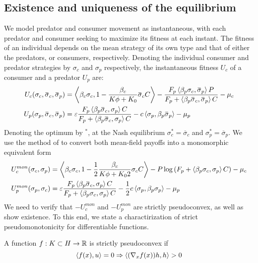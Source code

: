 \subsection*{Existence and uniqueness of the equilibrium}
We model predator and consumer movement as instantaneous, with each predator and consumer seeking to maximize its fitness at each instant. The fitness of an individual depends on the mean strategy of its own type and that of either the predators, or consumers, respectively. Denoting the individual consumer and predator strategies by $\sigma_c$ and $\sigma_p$ respectively, the instantaneous fitness $U_c$ of a consumer and a predator $U_p$ are:
\begin{align}
  U_c(\sigma_c, \overbar{\sigma}_c, \overbar{\sigma}_p) &= \ip{\beta_c \sigma_c}{1-\frac{\beta_c}{K\phi + K_0}\overbar{\sigma}_c C} - \frac{F_p \ip{\beta_p \sigma_c}{\overbar{\sigma}_p} P}{F_p + \ip{\beta_p \overbar{\sigma}_c}{\overbar{\sigma}_p} C} - \mu_c \\
  U_p(\sigma_p, \overbar{\sigma}_c, \overbar{\sigma}_p) &= \epsilon \frac{F_p \ip{\beta_p \overbar{\sigma}_c}{\sigma_p} C}{F_p + \ip{\beta_p \overbar{\sigma}_c}{\sigma_p} C} - c \ip{\sigma_p}{\beta_p \overbar{\sigma}_p}  - \mu_p
\end{align}
Denoting the optimum by $^*$, at the Nash equilibrium $\sigma_c^*=\overbar{\sigma}_c$ and $\sigma_p^* = \overbar{\sigma}_p$. We use the method of  to convert both mean-field payoffs into a monomorphic equivalent form 
\begin{align}
  \label{eq:mon_eq_forms}
  U_c^{mon}(\sigma_c, \sigma_p) &= \ip{\beta_c \sigma_c}{1-\frac{1}{2}\frac{\beta_c}{K\phi + K_0 2}\sigma_c C} - P\log\pa{F_p + \ip{\beta_p \sigma_c}{\sigma_p} C} - \mu_c \\
  U^{mon}_p(\sigma_p, \sigma_c) &= \epsilon \frac{F_p \ip{\beta_p \overbar{\sigma}_c}{\sigma_p} C}{F_p + \ip{\beta_p \sigma_c}{\sigma_p} C} - \frac{1}{2}c \ip{\sigma_p}{\beta_p \sigma_p}  - \mu_p
\end{align}
We need to verify that $-U_c^{mon}$ and $-U_p^{mon}$ are strictly pseudoconvex, as well as show existence. To this end, we state a charactirization of strict pseudomonotonicity for differentiable functions.
\begin{lemma}
  A function $f: K \subset H \to \mathbb{R}$ is strictly pseudoconvex if
  \begin{equation}
    \left \langle f(x),u \right \rangle = 0 \Rightarrow \left \langle (\nabla_x f(x))h,h \right \rangle > 0
  \end{equation}
\end{lemma}

